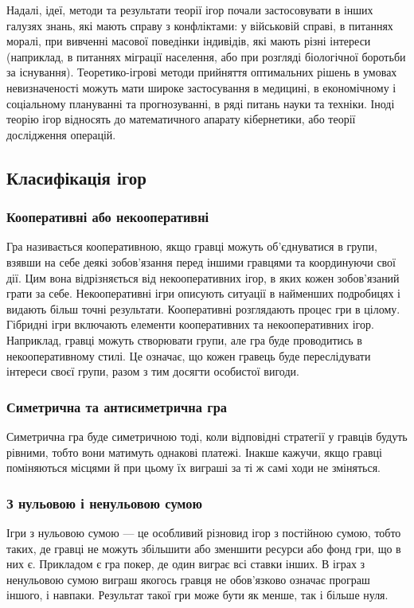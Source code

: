 \documentclass[a4paper]{article}
\begin{document}
Надалі, ідеї, методи та результати теорії ігор почали застосовувати в інших галузях знань, які мають справу з конфліктами: у військовій справі, в питаннях моралі, при вивченні масової поведінки індивідів, які мають різні інтереси (наприклад, в питаннях міграції населення, або при розгляді біологічної боротьби за існування). Теоретико-ігрові методи прийняття оптимальних рішень в умовах невизначеності можуть мати широке застосування в медицині, в економічному і соціальному плануванні та прогнозуванні, в ряді питань науки та техніки. Іноді теорію ігор відносять до математичного апарату кібернетики, або теорії дослідження операцій.

\subsection{Класифікація ігор}
\subsubsection*{Кооперативні або некооперативні}
Гра називається кооперативною, якщо гравці можуть об'єднуватися в групи, взявши на себе деякі зобов'язання перед іншими гравцями та координуючи свої дії. Цим вона відрізняється від некооперативних ігор, в яких кожен зобов'язаний грати за себе. Некооперативні ігри описують ситуації в найменших подробицях і видають більш точні результати. Кооперативні розглядають процес гри в цілому. Гібридні ігри включають елементи кооперативних та некооперативних ігор. Наприклад, гравці можуть створювати групи, але гра буде проводитись в некооперативному стилі. Це означає, що кожен гравець буде переслідувати інтереси своєї групи, разом з тим досягти особистої вигоди.

\subsubsection*{Симетрична та антисиметрична гра}
Симетрична гра буде симетричною тоді, коли відповідні стратегії у гравців будуть рівними, тобто вони матимуть однакові платежі. Інакше кажучи, якщо гравці поміняються місцями й при цьому їх виграші за ті ж самі ходи не зміняться.

\subsubsection*{З нульовою і ненульовою сумою}
Ігри з нульовою сумою — це особливий різновид ігор з постійною сумою, тобто таких, де гравці не можуть збільшити або зменшити ресурси або фонд гри, що в них є. Прикладом є гра покер, де один виграє всі ставки інших. В іграх з ненульовою сумою виграш якогось гравця не обов'язково означає програш іншого, і навпаки. Результат такої гри може бути як менше, так і більше нуля.
\end{document}
